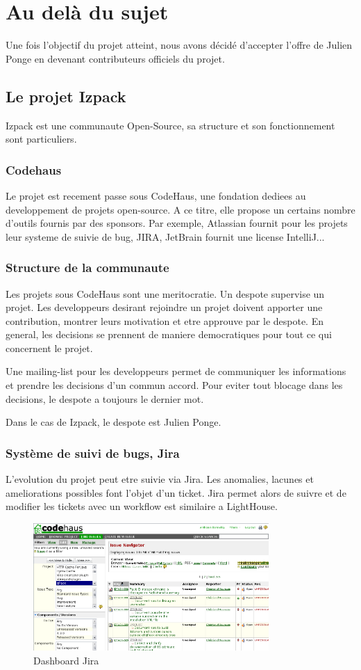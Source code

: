 \section{Au delà du sujet}
Une fois l'objectif du projet atteint, nous avons décidé d'accepter l'offre de Julien Ponge en devenant contributeurs officiels du projet. 
\subsection{Le projet Izpack}
Izpack est une communaute Open-Source, sa structure et son fonctionnement sont particuliers.
\subsubsection{Codehaus}
Le projet est recement passe sous CodeHaus, une fondation dediees au developpement de projets open-source. A ce titre, elle propose un certains nombre d'outils fournis par des sponsors. Par exemple, Atlassian fournit pour les projets leur systeme de suivie de bug, JIRA, JetBrain fournit une license IntelliJ...
\subsubsection{Structure de la communaute}
Les projets sous CodeHaus sont une meritocratie. Un despote supervise un projet. Les developpeurs desirant rejoindre un projet doivent apporter une contribution, montrer leurs motivation et etre approuve par le despote. En general, les decisions se prennent de maniere democratiques pour tout ce qui concernent le projet.

Une mailing-list pour les developpeurs permet de communiquer les informations et prendre les decisions d'un commun accord. Pour eviter tout blocage dans les decisions, le despote a toujours le dernier mot.

Dans le cas de Izpack, le despote est Julien Ponge.
\subsubsection{Système de suivi de bugs, Jira}
L'evolution du projet peut etre suivie via Jira. Les anomalies, lacunes et ameliorations possibles font l'objet d'un ticket. Jira permet alors de suivre et de modifier les tickets avec un workflow est similaire a LightHouse.
\begin{figure}[H]
	\centering
	\includegraphics[width=0.8\textwidth]{../image/jira.png}
	\caption{Dashboard Jira}
\end{figure}
